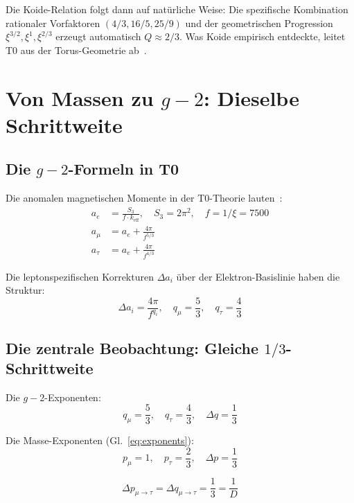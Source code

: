 Die Koide-Relation folgt dann auf natürliche Weise: Die spezifische Kombination rationaler Vorfaktoren $(4/3, 16/5, 25/9)$ und der geometrischen Progression $\xi^{3/2}, \xi^1, \xi^{2/3}$ erzeugt automatisch $Q \approx 2/3$. Was Koide empirisch entdeckte, leitet T0 aus der Torus-Geometrie ab~\cite{Pascher116}.

\section{Von Massen zu $g-2$: Dieselbe Schrittweite}

\subsection{Die $g-2$-Formeln in T0}

Die anomalen magnetischen Momente in der T0-Theorie lauten~\cite{Pascher018}:
\begin{align}
	a_e &= \frac{S_3}{f \cdot k_\text{eff}}, \quad S_3 = 2\pi^2, \quad f = 1/\xi = 7500 \\
	a_\mu &= a_e + \frac{4\pi}{f^{5/3}} \\
	a_\tau &= a_e + \frac{4\pi}{f^{4/3}}
\end{align}

Die leptonspezifischen Korrekturen $\Delta a_i$ über der Elektron-Basislinie haben die Struktur:
\begin{equation}
	\Delta a_i = \frac{4\pi}{f^{q_i}}, \quad q_\mu = \frac{5}{3}, \quad q_\tau = \frac{4}{3}
	\label{eq:g2exponents}
\end{equation}

\subsection{Die zentrale Beobachtung: Gleiche $1/3$-Schrittweite}

Die $g-2$-Exponenten:
\begin{equation}
	q_\mu = \frac{5}{3}, \quad q_\tau = \frac{4}{3}, \quad \Delta q = \frac{1}{3}
\end{equation}

Die Masse-Exponenten (Gl.~\ref{eq:exponents}):
\begin{equation}
	p_\mu = 1, \quad p_\tau = \frac{2}{3}, \quad \Delta p = \frac{1}{3}
\end{equation}

\begin{equation}
	\boxed{\Delta p_{\mu\to\tau} = \Delta q_{\mu\to\tau} = \frac{1}{3} = \frac{1}{D}}
\end{equation}

